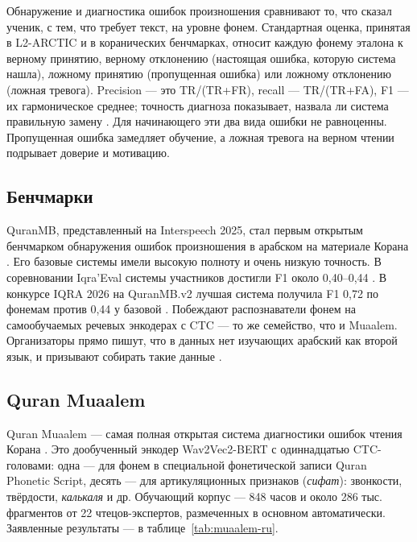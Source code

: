 \documentclass[a4paper,14pt]{extarticle}
\begin{document}
Обнаружение и диагностика ошибок произношения сравнивают то, что сказал ученик, с тем, что требует
текст, на уровне фонем. Стандартная оценка, принятая в L2-ARCTIC и в коранических бенчмарках, относит
каждую фонему эталона к верному принятию, верному отклонению (настоящая ошибка, которую система
нашла), ложному принятию (пропущенная ошибка) или ложному отклонению (ложная тревога). Precision ---
это TR/(TR+FR), recall --- TR/(TR+FA), F1 --- их гармоническое среднее; точность диагноза показывает,
назвала ли система правильную замену \cite{SRC-063,SRC-064}. Для начинающего эти два вида ошибки не
равноценны. Пропущенная ошибка замедляет обучение, а ложная тревога на верном чтении подрывает доверие
и мотивацию.

\subsection{Бенчмарки}

QuranMB, представленный на Interspeech 2025, стал первым открытым бенчмарком обнаружения ошибок
произношения в арабском на материале Корана \cite{SRC-004}. Его базовые системы имели высокую полноту и
очень низкую точность. В соревновании Iqra'Eval системы участников достигли F1 около 0,40--0,44
\cite{SRC-043}. В конкурсе IQRA 2026 на QuranMB.v2 лучшая система получила F1 0,72 по фонемам против
0,44 у базовой \cite{SRC-031,SRC-086}. Побеждают распознаватели фонем на самообучаемых речевых
энкодерах с CTC --- то же семейство, что и Muaalem. Организаторы прямо пишут, что в данных нет
изучающих арабский как второй язык, и призывают собирать такие данные \cite{SRC-031}.

\subsection{Quran Muaalem}

Quran Muaalem --- самая полная открытая система диагностики ошибок чтения Корана \cite{SRC-002,SRC-003}.
Это дообученный энкодер Wav2Vec2-BERT с одиннадцатью CTC-головами: одна --- для фонем в специальной
фонетической записи Quran Phonetic Script, десять --- для артикуляционных признаков (\emph{сифат}):
звонкости, твёрдости, \emph{калькаля} и др. Обучающий корпус --- 848 часов и около 286 тыс. фрагментов
от 22 чтецов-экспертов, размеченных в основном автоматически. Заявленные результаты --- в
таблице~\ref{tab:muaalem-ru}.
\end{document}
